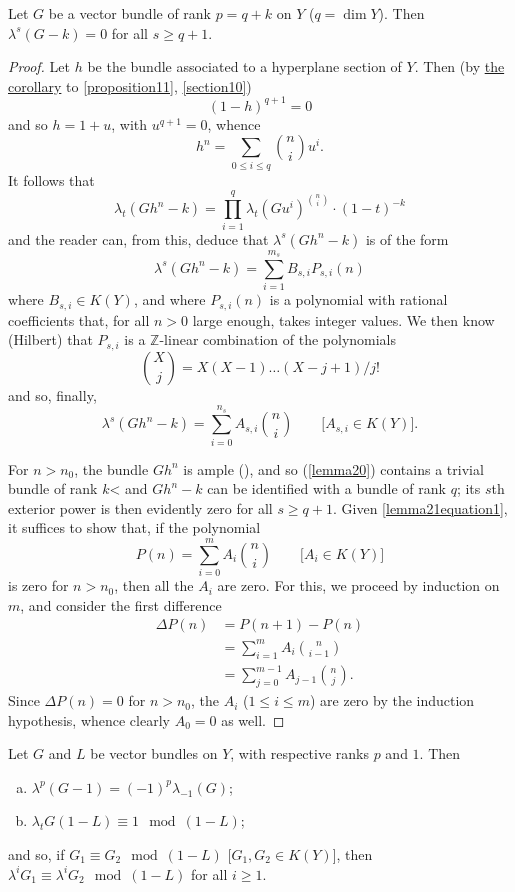 \documentclass{article}
\theoremstyle{plain}
\newenvironment{lemma}[1]
    {\renewcommand\theinnercustomlemma{#1}\innercustomlemma}
    {\endinnercustomlemma}
\theoremstyle{definition}
\renewcommand{\geq}{\geqslant}
\renewcommand{\leq}{\leqslant}
\newcommand{\oldpage}[1]{\marginpar{\footnotesize$\Big\vert$ \textit{p.~#1}}}
\begin{document}
\begin{lemma}{21}
\label{lemma21}
  Let $G$ be a vector bundle of rank $p=q+k$ on $Y$ ($q=\dim Y$).
  Then $\lambda^s(G- k)=0$ for all $s\geq q+1$.
\end{lemma}

\begin{proof}
  Let $h$ be the bundle associated to a hyperplane section of $Y$.
  Then (by \hyperref[corollary-11]{the corollary} to \cref{proposition11}, \cref{section10})
  \[
    (1-h)^{q+1} = 0
  \]
  and so $h=1+u$, with $u^{q+1}=0$, whence
  \[
    h^n = \sum_{0\leq i\leq q}\binom{n}{i}u^i.
  \]
  It follows that
  \[
    \lambda_t(Gh^n- k) = \prod_{i=1}^q \lambda_t(Gu^i)^{\binom{n}{i}}\cdot(1-t)^{-k}
  \]
  and the reader can, from this, deduce that $\lambda^s(Gh^n- k)$ is of the form
  \[
    \lambda^s(Gh^n- k) = \sum_{i=1}^{m_s} B_{s,i}P_{s,i}(n)
  \]
  where $B_{s,i}\in K(Y)$, and where $P_{s,i}(n)$ is a polynomial with rational coefficients that, for all $n>0$ large enough, takes integer values.
  We then know (Hilbert) that $P_{s,i}$ is a $\mathbb{Z}$-linear combination of the polynomials
  \[
    \binom{X}{j} = X(X-1)\ldots(X-j+1)/j!
  \]
  and so, finally,
  \[
  \label{lemma21equation1}
    \lambda^s(Gh^n- k) = \sum_{i=0}^{n_s} A_{s,i}\binom{n}{i}
    \qquad\mbox{[$A_{s,i}\in K(Y)$].}
    \tag{1}
  \]

  For $n>n_0$, the bundle $Gh^n$ is ample (\cite{12}), and so (\cref{lemma20}) contains a trivial bundle of rank $k$< and $Gh^n- k$ can be identified with a bundle of rank $q$;
  its $s$th exterior power is then evidently zero for all $s\geq q+1$.
  Given \cref{lemma21equation1}, it
\oldpage{134}
  suffices to show that, if the polynomial
  \[
    P(n) = \sum_{i=0}^m A_i\binom{n}{i}
    \qquad\mbox{[$A_i\in K(Y)$]}
  \]
  is zero for $n>n_0$, then all the $A_i$ are zero.
  For this, we proceed by induction on $m$, and consider the first difference
  \begin{align*}
    \Delta P(n)
    &= P(n+1) - P(n)
  \\&= \sum_{i=1}^m A_i\binom{n}{i-1}
  \\&= \sum_{j=0}^{m-1} A_{j-1}\binom{n}{j}.
  \end{align*}
  Since $\Delta P(n)=0$ for $n>n_0$, the $A_i$ ($1\leq i\leq m$) are zero by the induction hypothesis, whence clearly $A_0=0$ as well.
\end{proof}

\begin{lemma}{22}
\label{lemma22}
  Let $G$ and $L$ be vector bundles on $Y$, with respective ranks $p$ and $1$.
  Then
  \begin{enumerate}[(a)]
    \item $\lambda^p(G-1) = (-1)^p\lambda_{-1}(G)$;
    \item $\lambda_t G(1- L) \equiv 1\mod(1-L)$;
  \end{enumerate}
  and so, if $G_1\equiv G_2\mod(1-L)$ [$G_1,G_2\in K(Y)$], then $\lambda^iG_1\equiv\lambda^iG_2\mod(1-L)$ for all $i\geq1$.
\end{lemma}
\end{document}
